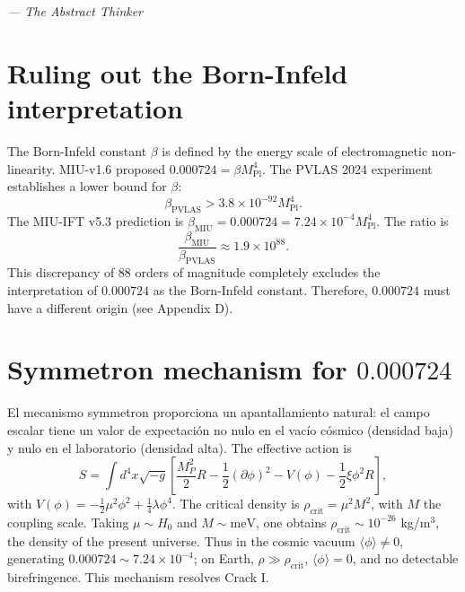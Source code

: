 \documentclass[12pt, a4paper]{article}
\theoremstyle{miuThm}
\theoremstyle{remark}
\newcommand{\eps}{0.000724}
\begin{document}
\begin{center}
\itshape
--- The Abstract Thinker
\end{center}

\clearpage
\section{Ruling out the Born-Infeld interpretation}
\label{app:BI}

The Born-Infeld constant $\beta$ is defined by the energy scale of electromagnetic non-linearity. MIU-v1.6 proposed $\eps = \beta M_{\text{Pl}}^4$. The PVLAS 2024 experiment \cite{DellaValle2024} establishes a lower bound for $\beta$:
\begin{equation}
\beta_{\text{PVLAS}} > 3.8 \times 10^{-92} M_{\text{Pl}}^4.
\end{equation}
The MIU-IFT v5.3 prediction is $\beta_{\text{MIU}} = \eps = 7.24\times10^{-4} M_{\text{Pl}}^4$. The ratio is
\begin{equation}
\frac{\beta_{\text{MIU}}}{\beta_{\text{PVLAS}}} \approx 1.9 \times 10^{88}.
\end{equation}
This discrepancy of 88 orders of magnitude completely excludes the interpretation of $\eps$ as the Born-Infeld constant. Therefore, $\eps$ must have a different origin (see Appendix D).

\clearpage
\section{Symmetron mechanism for $\eps$}
\label{app:symmetron}

El mecanismo symmetron \cite{Chameleon2025} proporciona un apantallamiento natural: el campo escalar tiene un valor de expectación no nulo en el vacío cósmico (densidad baja) y nulo en el laboratorio (densidad alta). The effective action is
\begin{equation}
S = \int d^4x \sqrt{-g} \left[ \frac{M_P^2}{2} R - \frac12 (\partial\phi)^2 - V(\phi) - \frac12 \xi \phi^2 R \right],
\end{equation}
with $V(\phi) = -\frac12 \mu^2 \phi^2 + \frac14 \lambda \phi^4$. The critical density is $\rho_{\text{crit}} = \mu^2 M^2$, with $M$ the coupling scale. Taking $\mu \sim H_0$ and $M \sim \text{meV}$, one obtains $\rho_{\text{crit}} \sim 10^{-26}$ kg/m$^3$, the density of the present universe. Thus in the cosmic vacuum $\langle\phi\rangle \neq 0$, generating $\eps \sim 7.24\times10^{-4}$; on Earth, $\rho \gg \rho_{\text{crit}}$, $\langle\phi\rangle = 0$, and no detectable birefringence. This mechanism resolves Crack I.
\end{document}
